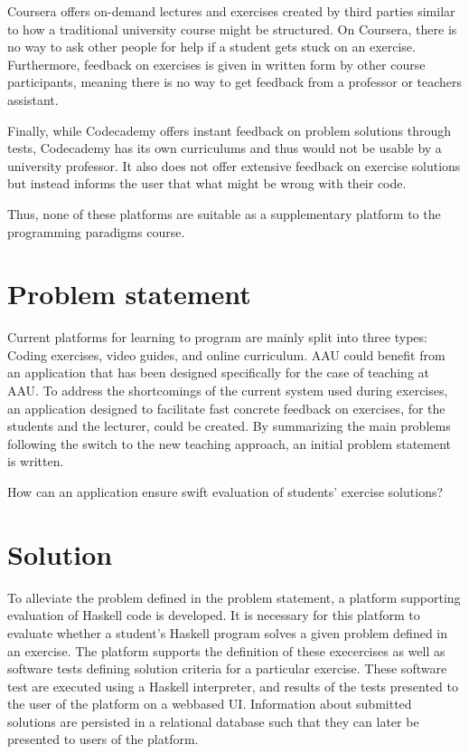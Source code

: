 Coursera offers on-demand lectures and exercises created by third parties similar to how a traditional university course might be structured.
On Coursera, there is no way to ask other people for help if a student gets stuck on an exercise.
Furthermore, feedback on exercises is given in written form by other course participants, meaning there is no way to get feedback from a professor or teachers assistant. 


Finally, while Codecademy offers instant feedback on problem solutions through tests, Codecademy has its own curriculums and thus would not be usable by a university professor. 
It also does not offer extensive feedback on exercise solutions but instead informs the user that what might be wrong with their code. 


Thus, none of these platforms are suitable as a supplementary platform to the programming paradigms course. 
\section{Problem statement}
Current platforms for learning to program are mainly split into three types: Coding exercises, video guides, and online curriculum. 
AAU could benefit from an application that has been designed specifically for the case of teaching at AAU.
To address the shortcomings of the current system used during exercises, an application designed to facilitate fast concrete feedback on exercises, for the students and the lecturer, could be created.
By summarizing the main problems following the switch to the new teaching approach, an initial problem statement is written.
\begin{displayquote}
    How can an application ensure swift evaluation of students' exercise solutions?
\end{displayquote} 

\section{Solution}
To alleviate the problem defined in the problem statement, a platform supporting evaluation of Haskell code is developed. It is necessary for this platform to evaluate whether a student's Haskell program solves a given problem defined in an exercise. The platform supports the definition of these execercises as well as software tests defining solution criteria for a particular exercise. These software test are executed using a Haskell interpreter, and results of the tests presented to the user of the platform on a webbased UI.  
Information about submitted solutions are persisted in a relational database such that they can later be presented to users of the platform.  

